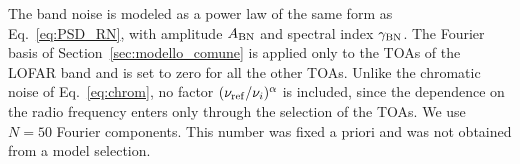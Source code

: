 The band noise is modeled as a power law of the same form as
Eq.~\eqref{eq:PSD_RN}, with amplitude $A_{\rm BN}$ and spectral index
$\gamma_{\rm BN}$. The Fourier basis of Section~\ref{sec:modello_comune} is
applied only to the TOAs of the LOFAR band and is set to zero for all the other
TOAs. Unlike the chromatic noise of Eq.~\eqref{eq:chrom}, no factor
$(\nu_{\rm ref}/\nu_i)^{\alpha}$ is included, since the dependence on the radio
frequency enters only through the selection of the TOAs. We use $N = 50$
Fourier components. This number was fixed a priori and was not obtained from a
model selection.